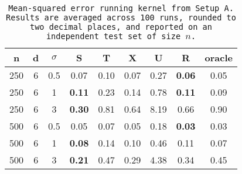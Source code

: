 \begin{table}[ht]
\centering
\begin{tabular}{ccccccccc}
  \hline
n & d & $\sigma$ & S & T & X & U & R & oracle \\ 
  \hline
250 & 6 & 0.5 & 0.07 & 0.10 & 0.07 &  0.27 & \bf 0.06 & 0.05 \\ 
  250 & 6 & 1 & \bf 0.11 & 0.23 & 0.14 &  0.78 & \bf 0.11 & 0.09 \\ 
  250 & 6 & 3 & \bf 0.30 & 0.81 & 0.64 &  8.19 & 0.66 & 0.90 \\ 
  500 & 6 & 0.5 & 0.05 & 0.07 & 0.05 &  0.18 & \bf 0.03 & 0.03 \\ 
  500 & 6 & 1 & \bf 0.08 & 0.14 & 0.10 &  0.46 & 0.11 & 0.07 \\ 
  500 & 6 & 3 & \bf 0.21 & 0.47 & 0.29 &  4.38 & 0.34 & 0.45 \\ 
   \hline
\end{tabular}
\caption{\tt Mean-squared error running \texttt{kernel} from Setup A. Results are averaged across 100 runs, rounded to two decimal places, and reported on an independent test set of size $n$.} 
\label{table:setup1}
\end{table}
